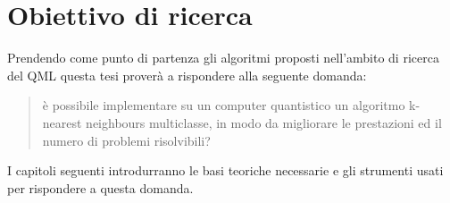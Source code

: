 \section{Obiettivo di ricerca} %

Prendendo come punto di partenza gli algoritmi proposti nell'ambito di ricerca del \ac{QML} 
questa tesi proverà a rispondere alla seguente domanda:
\begin{quote}
    è possibile implementare su un computer quantistico un algoritmo k-nearest neighbours 
    multiclasse, in modo da migliorare le prestazioni ed il numero di problemi risolvibili?
\end{quote}
I capitoli seguenti introdurranno le basi teoriche necessarie e gli strumenti usati 
per rispondere a questa domanda. 


